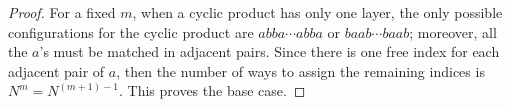 \documentclass[11pt,reqno]{amsart}
\numberwithin{equation}{section}
\theoremstyle{plain}
\begin{document}
\begin{proof}
For a fixed $m$, when a cyclic product has only one layer, the only possible configurations for the cyclic product are $abba\cdots abba$ or $baab\cdots baab$; moreover, all the $a$'s must be matched in adjacent pairs. Since there is one free index for each adjacent pair of $a$, then the number of ways to assign the remaining indices is $N^{m}=N^{(m+1)-1}$. This proves the base case.




\end{proof}
\end{document}
